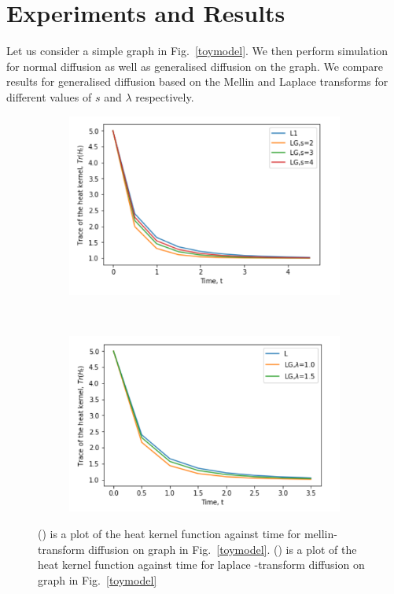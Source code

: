 \documentclass[12pt]{article}
\begin{document}
\section{Experiments and Results}
Let us consider a simple graph in Fig.~\ref{toymodel}. We then perform simulation for normal diffusion as well as generalised diffusion on the graph. We compare results for generalised diffusion based on the Mellin and Laplace transforms for different values of $s$ and $\lambda$ respectively.
\begin{figure}[H]
	\centering
	\begin{subfigure}[b]{0.45\textwidth}
		\includegraphics[width= \textwidth]{images/model-1-mellin.png}
		\caption{}
		\label{model1-mellin}
	\end{subfigure}~
	\begin{subfigure}[b]{0.45\textwidth}
		\includegraphics[width= \textwidth]{images/model-1-Laplace.png}
		\caption{}
		\label{model1-laplace}
	\end{subfigure} 
     \caption{() is a plot of the heat kernel function against time for mellin-transform diffusion on graph in Fig.~\ref{toymodel}. () is a plot of the heat kernel function against time for laplace -transform diffusion on graph in Fig.~\ref{toymodel}}
     \label{toy-mellin-laplace}
\end{figure}
\end{document}
